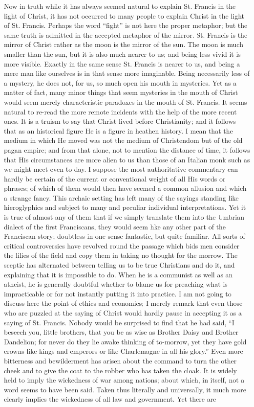 \documentclass{book}
\begin{document}
Now in truth while it has always seemed natural to explain St. Francis in the light of Christ, it has not occurred to many people to explain Christ in the light of St. Francis. Perhaps the word “fight” is not here the proper metaphor; but the same truth is admitted in the accepted metaphor of the mirror. St. Francis is the mirror of Christ rather as the moon is the mirror of the sun. The moon is much smaller than the sun, but it is also much nearer to us; and being less vivid it is more visible. Exactly in the same sense St. Francis is nearer to us, and being a mere man like ourselves is in that sense more imaginable. Being necessarily less of a mystery, he does not, for us, so much open his mouth in mysteries. Yet as a matter of fact, many minor things that seem mysteries in the mouth of Christ would seem merely characteristic paradoxes in the mouth of St. Francis. It seems natural to re-read the more remote incidents with the help of the more recent ones. It is a truism to say that Christ lived before Christianity; and it follows that as an historical figure He is a figure in heathen history. I mean that the medium in which He moved was not the medium of Christendom but of the old pagan empire; and from that alone, not to mention the distance of time, it follows that His circumstances are more alien to us than those of an Italian monk such as we might meet even to-day. I suppose the most authoritative commentary can hardly be certain of the current or conventional weight of all His words or phrases; of which of them would then have seemed a common allusion and which a strange fancy. This archaic setting has left many of the sayings standing like hieroglyphics and subject to many and peculiar individual interpretations. Yet it is true of almost any of them that if we simply translate them into the Umbrian dialect of the first Franciscans, they would seem hke any other part of the Franciscan story; doubtless in one sense fantastic, but quite familiar. All sorts of critical controversies have revolved round the passage which bids men consider the lilies of the field and copy them in taking no thought for the morrow. The sceptic has alternated between telling us to be true Christians and do it, and explaining that it is impossible to do. When he is a communist as well as an atheist, he is generally doubtful whether to blame us for preaching what is impracticable or for not instantly putting it into practice. I am not going to discuss here the point of ethics and economics; I merely remark that even those who are puzzled at the saying of Christ would hardly pause in accepting it as a saying of St. Francis. Nobody would be surprised to find that he had said, “I beseech you, little brothers, that you be as wise as Brother Daisy and Brother Dandelion; for never do they lie awake thinking of to-morrow, yet they have gold crowns like kings and emperors or like Charlemagne in all his glory.” Even more bitterness and bewilderment has arisen about the command to turn the other cheek and to give the coat to the robber who has taken the cloak. It is widely held to imply the wickedness of war among nations; about which, in itself, not a word seems to have been said. Taken thus literally and universally, it much more clearly implies the wickedness of all law and government. Yet there are 
\end{document}

